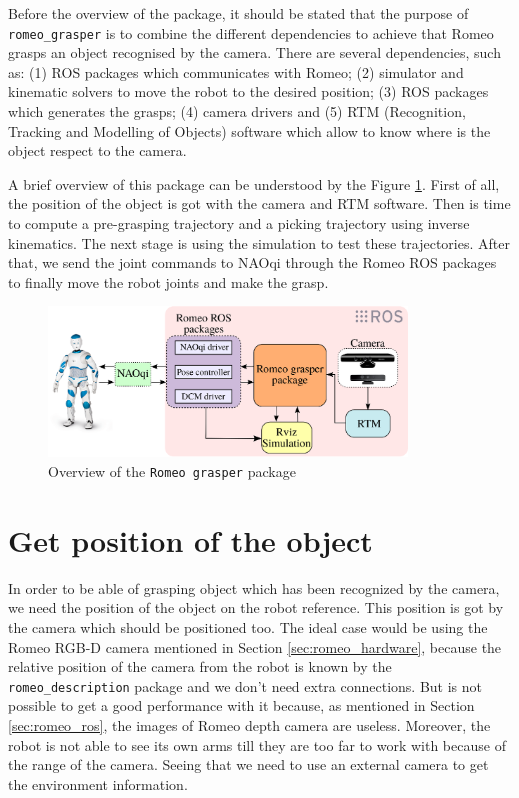 \documentclass[12pt,a4paper,final,twoside,openright]{report}
\begin{document}
Before the overview of the package, it should be stated that the purpose of \texttt{romeo\_grasper} is to combine the different dependencies to achieve that Romeo grasps an object recognised by the camera. There are several dependencies, such as: (1) ROS packages which communicates with Romeo; (2) simulator and kinematic solvers to move the robot to the desired position; (3) ROS packages which generates the grasps; (4) camera drivers and (5) RTM (Recognition, Tracking and Modelling of Objects) software which allow to know where is the object respect to the camera.

A brief overview of this package can be understood by the Figure \ref{fig:overview_design}. First of all, the position of the object is got with the camera and RTM software. Then is time to compute a pre-grasping trajectory and a picking trajectory using inverse kinematics. The next stage is using the simulation to test these trajectories. After that, we send the joint commands to NAOqi through the Romeo ROS packages to finally move the robot joints and make the grasp.


\begin{figure}[h]
\centering
\includegraphics[width=0.85\textwidth]{images/package_design.eps}
\caption{Overview of the \texttt{Romeo grasper} package \label{fig:overview_design}}
\end{figure}

\section{Get position of the object}

In order to be able of grasping object which has been recognized by the camera, we need the position of the object on the robot reference. This position is got by the camera which should be positioned too. The ideal case would be using the Romeo RGB-D camera mentioned in Section \ref{sec:romeo_hardware}, because the relative position of the camera from the robot is known by the \texttt{romeo\_description} package and we don't need extra connections. But is not possible to get a good performance with it because, as mentioned in Section \ref{sec:romeo_ros}, the images of Romeo depth camera are useless. Moreover, the robot is not able to see its own arms till they are too far to work with because of the range of the camera. Seeing that we need to use an external camera to get the environment information.
\end{document}

